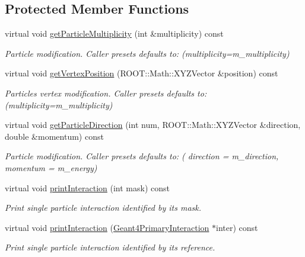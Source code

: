 \subsection*{Protected Member Functions}
\begin{DoxyCompactItemize}
\item 
virtual void \hyperlink{class_d_d4hep_1_1_simulation_1_1_geant4_particle_generator_a641c865de37d428ede06ea6dc4ae5f33}{get\+Particle\+Multiplicity} (int \&multiplicity) const
\begin{DoxyCompactList}\small\item\em Particle modification. Caller presets defaults to\+: (multiplicity=m\+\_\+multiplicity) \end{DoxyCompactList}\item 
virtual void \hyperlink{class_d_d4hep_1_1_simulation_1_1_geant4_particle_generator_a32606cece5c3e45ca810aabd5909d442}{get\+Vertex\+Position} (R\+O\+O\+T\+::\+Math\+::\+X\+Y\+Z\+Vector \&position) const
\begin{DoxyCompactList}\small\item\em Particle\textquotesingle{}s vertex modification. Caller presets defaults to\+: (multiplicity=m\+\_\+multiplicity) \end{DoxyCompactList}\item 
virtual void \hyperlink{class_d_d4hep_1_1_simulation_1_1_geant4_particle_generator_a877449e84d0d8ccf2ca52584db3b0fab}{get\+Particle\+Direction} (int num, R\+O\+O\+T\+::\+Math\+::\+X\+Y\+Z\+Vector \&direction, double \&momentum) const
\begin{DoxyCompactList}\small\item\em Particle modification. Caller presets defaults to\+: ( direction = m\+\_\+direction, momentum = m\+\_\+energy) \end{DoxyCompactList}\item 
virtual void \hyperlink{class_d_d4hep_1_1_simulation_1_1_geant4_particle_generator_aeddc0bbe704e7104915cb1251ee70ad7}{print\+Interaction} (int mask) const
\begin{DoxyCompactList}\small\item\em Print single particle interaction identified by its mask. \end{DoxyCompactList}\item 
virtual void \hyperlink{class_d_d4hep_1_1_simulation_1_1_geant4_particle_generator_a4adbe957bd1c98ca2e739929c4382996}{print\+Interaction} (\hyperlink{class_d_d4hep_1_1_simulation_1_1_geant4_primary_interaction}{Geant4\+Primary\+Interaction} $\ast$inter) const
\begin{DoxyCompactList}\small\item\em Print single particle interaction identified by it\textquotesingle{}s reference. \end{DoxyCompactList}\end{DoxyCompactItemize}
